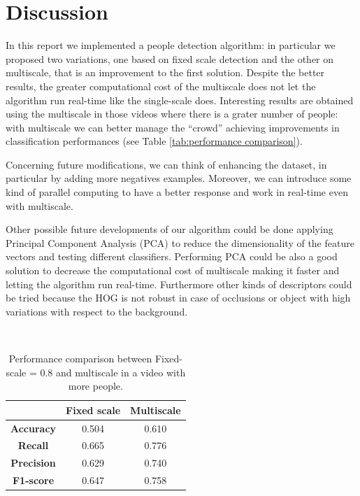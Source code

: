 \documentclass[a4paper,letterpaper, 11pt, onecolumn]{article} %
\begin{document}
\section{Discussion}\label{discussion}
In this report we implemented a people detection algorithm: in particular we proposed two variations, one based on fixed scale detection and the other on multiscale, that is an improvement to the first solution. Despite the better results, the greater computational cost of the multiscale does not let the algorithm run real-time like the single-scale does. 
Interesting results are obtained using the multiscale in those videos where there is a grater number of people: with multiscale we can better manage the ``crowd'' achieving improvements in classification performances (see Table \ref{tab:performance comparison}).


Concerning future modifications, we can think of enhancing the dataset, in particular by adding more negatives examples. Moreover, we can introduce some kind of parallel computing to have a better response and work in real-time even with multiscale. 

Other possible future developments of our algorithm could be done applying Principal Component Analysis (PCA) to reduce the dimensionality of the feature vectors and testing different classifiers. Performing PCA could be also a good solution to decrease the computational cost of multiscale making it faster and letting the algorithm run real-time. Furthermore other kinds of descriptors could be tried because the HOG is not robust in case of occlusions or object with high variations with respect to the background.

\
\begin{table}[h!]
\centering
\begin{tabular}{c||c|c}
&\textbf{Fixed scale} & \textbf{Multiscale}\\
\hline \hline 
\textbf{Accuracy} &0.504 & 0.610\\
\textbf{Recall} &0.665  & 0.776\\
\textbf{Precision} & 0.629 &  0.740\\
\textbf{F1-score} & 0.647& 0.758\\
\end{tabular}
\caption{Performance comparison between Fixed-scale = 0.8 and multiscale in a video with more people.}
\label{tab:performance compairson}
\end{table}
\end{document}
